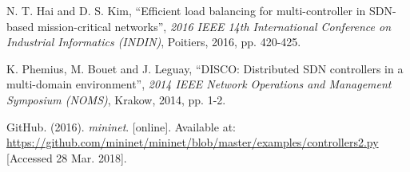 \documentclass[12pt, a4paper]{article}
\begin{document}




\begin{thebibliography}{99}
  \footnotesize

  N. T. Hai and D. S. Kim,
  ``Efficient load balancing for multi-controller in SDN-based mission-critical networks'',
  \textit{2016 IEEE 14th International Conference on Industrial Informatics (INDIN)},
  Poitiers,
  2016,
  pp. 420-425.

  K. Phemius, M. Bouet and J. Leguay,
  ``DISCO: Distributed SDN controllers in a multi-domain environment'',
  \textit{2014 IEEE Network Operations and Management Symposium (NOMS)},
  Krakow,
  2014,
  pp. 1-2.

  GitHub. (2016).
  \textit{mininet}. [online].
  Available at: \url{https://github.com/mininet/mininet/blob/master/examples/controllers2.py}
  [Accessed 28 Mar. 2018].
\end{thebibliography}
\end{document}
